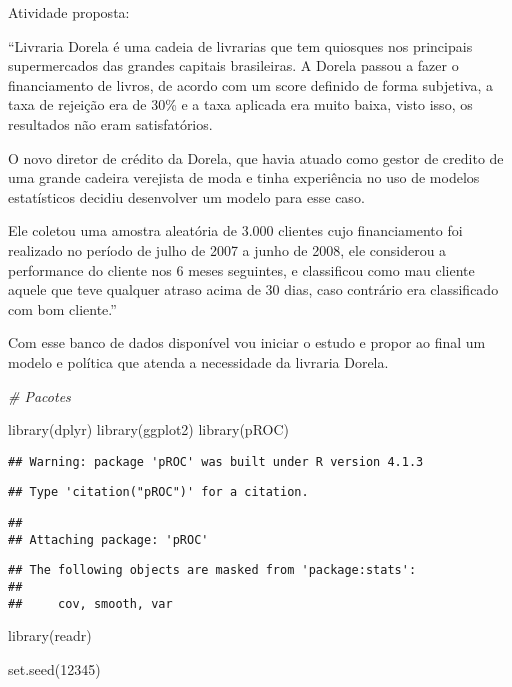 \documentclass[
]{book}
\newenvironment{Shaded}{\begin{snugshade}}{\end{snugshade}}
\newcommand{\CommentTok}[1]{\textcolor[rgb]{0.56,0.35,0.01}{\textit{#1}}}
\newcommand{\DecValTok}[1]{\textcolor[rgb]{0.00,0.00,0.81}{#1}}
\newcommand{\FunctionTok}[1]{\textcolor[rgb]{0.00,0.00,0.00}{#1}}
\newcommand{\NormalTok}[1]{#1}
\begin{document}
Atividade proposta:

``Livraria Dorela é uma cadeia de livrarias que tem quiosques nos principais supermercados das grandes capitais brasileiras. A Dorela passou a fazer o financiamento de livros, de acordo com um score definido de forma subjetiva, a taxa de rejeição era de 30\% e a taxa aplicada era muito baixa, visto isso, os resultados não eram satisfatórios.

O novo diretor de crédito da Dorela, que havia atuado como gestor de credito de uma grande cadeira verejista de moda e tinha experiência no uso de modelos estatísticos decidiu desenvolver um modelo para esse caso.

Ele coletou uma amostra aleatória de 3.000 clientes cujo financiamento foi realizado no período de julho de 2007 a junho de 2008, ele considerou a performance do cliente nos 6 meses seguintes, e classificou como mau cliente aquele que teve qualquer atraso acima de 30 dias, caso contrário era classificado com bom cliente.''

Com esse banco de dados disponível vou iniciar o estudo e propor ao final um modelo e política que atenda a necessidade da livraria Dorela.

\begin{Shaded}
\begin{Highlighting}[]
\CommentTok{\# Pacotes}

\FunctionTok{library}\NormalTok{(dplyr)}
\FunctionTok{library}\NormalTok{(ggplot2)}
\FunctionTok{library}\NormalTok{(pROC)}
\end{Highlighting}
\end{Shaded}

\begin{verbatim}
## Warning: package 'pROC' was built under R version 4.1.3
\end{verbatim}

\begin{verbatim}
## Type 'citation("pROC")' for a citation.
\end{verbatim}

\begin{verbatim}
## 
## Attaching package: 'pROC'
\end{verbatim}

\begin{verbatim}
## The following objects are masked from 'package:stats':
## 
##     cov, smooth, var
\end{verbatim}

\begin{Shaded}
\begin{Highlighting}[]
\FunctionTok{library}\NormalTok{(readr)}

\FunctionTok{set.seed}\NormalTok{(}\DecValTok{12345}\NormalTok{)}
\end{Highlighting}
\end{Shaded}
\end{document}
